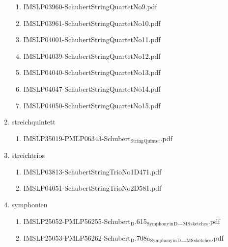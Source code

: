 \documentclass[11pt]{article}
\begin{document}
\begin{enumerate}
\begin{enumerate}
\item IMSLP03960-SchubertStringQuartetNo9.pdf
\label{sec-1-1-1-1-44-60-2-9}

\item IMSLP03961-SchubertStringQuartetNo10.pdf
\label{sec-1-1-1-1-44-60-2-10}

\item IMSLP04001-SchubertStringQuartetNo11.pdf
\label{sec-1-1-1-1-44-60-2-11}

\item IMSLP04039-SchubertStringQuartetNo12.pdf
\label{sec-1-1-1-1-44-60-2-12}

\item IMSLP04040-SchubertStringQuartetNo13.pdf
\label{sec-1-1-1-1-44-60-2-13}

\item IMSLP04047-SchubertStringQuartetNo14.pdf
\label{sec-1-1-1-1-44-60-2-14}

\item IMSLP04050-SchubertStringQuartetNo15.pdf
\label{sec-1-1-1-1-44-60-2-15}
\end{enumerate}

\item streichquintett
\label{sec-1-1-1-1-44-60-3}
\begin{enumerate}
\item IMSLP35019-PMLP06343-Schubert$_{\text{String}}$$_{\text{Quintet}}$.pdf
\label{sec-1-1-1-1-44-60-3-1}
\end{enumerate}

\item streichtrios
\label{sec-1-1-1-1-44-60-4}
\begin{enumerate}
\item IMSLP03813-SchubertStringTrioNo1D471.pdf
\label{sec-1-1-1-1-44-60-4-1}

\item IMSLP04051-SchubertStringTrioNo2D581.pdf
\label{sec-1-1-1-1-44-60-4-2}
\end{enumerate}

\item symphonien
\label{sec-1-1-1-1-44-60-5}
\begin{enumerate}
\item IMSLP25052-PMLP56255-Schubert$_{\text{D}}$.615$_{\text{Symphony}}$$_{\text{in}}$$_{\text{D}}$\_$_{\text{MS}}$$_{\text{sketches}}$.pdf
\label{sec-1-1-1-1-44-60-5-1}

\item IMSLP25053-PMLP56262-Schubert$_{\text{D}}$.708a$_{\text{Symphony}}$$_{\text{in}}$$_{\text{D}}$\_$_{\text{MS}}$$_{\text{sketches}}$.pdf
\label{sec-1-1-1-1-44-60-5-2}


\end{enumerate}
\end{enumerate}
\end{document}
